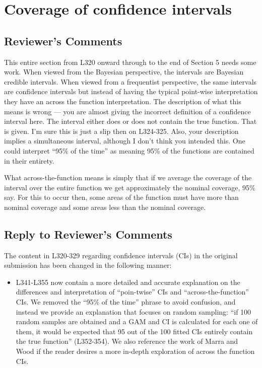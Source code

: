 \documentclass[
]{article}
\providecommand{\tightlist}{%
  \setlength{\itemsep}{0pt}\setlength{\parskip}{0pt}}
\begin{document}
\hypertarget{coverage-of-confidence-intervals}{%
\section{Coverage of confidence intervals}\label{coverage-of-confidence-intervals}}

\hypertarget{reviewers-comments-7}{%
\subsection{Reviewer's Comments}\label{reviewers-comments-7}}

This entire section from L320 onward through to the end of Section 5 needs some work. When viewed from the Bayesian perspective, the intervals are Bayesian credible intervals. When viewed from a frequentist perspective, the same intervals are confidence intervals but instead of having the typical point-wise interpretation they have an across the function interpretation.
The description of what this means is wrong --- you are almost giving the incorrect definition of a confidence interval here. The interval either does or does not contain the true function. That is given. I'm sure this is just a slip then on L324-325.
Also, your description implies a simultaneous interval, although I don't think you intended this. One could interpret ``95\% of the time'' as meaning 95\% of the functions are contained in their entirety.

What across-the-function means is simply that if we average the coverage of the interval over the entire function we get approximately the nominal coverage, 95\% say. For this to occur then, some areas of the function must have more
than nominal coverage and some areas less than the nominal coverage.

\hypertarget{section-8}{%
\subsection{\texorpdfstring{\textcolor{reviewersblue} {Reply to Reviewer's Comments}}{}}\label{section-8}}

The content in L320-329 regarding confidence intervals (CIs) in the original submission has been changed in the following manner:

\begin{itemize}
\tightlist
\item
  L341-L355 now contain a more detailed and accurate explanation on the differences and interpretation of ``poin-twise'' CIs and ``across-the-function'' CIs. We removed the ``95\% of the time'' phrase to avoid confusion, and instead we provide an explanation that focuses on random sampling: ``if 100 random samples are obtained and a GAM and CI is calculated for each one of them, it would be expected that 95 out of the 100 fitted CIs entirely contain the true function'' (L352-354). We also reference the work of Marra and Wood if the reader desires a more in-depth exploration of across the function CIs.
\end{itemize}
\end{document}
